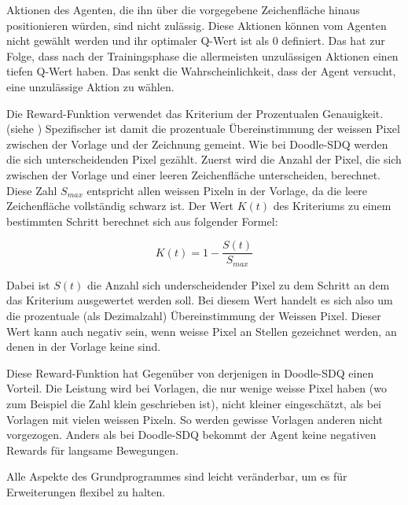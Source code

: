 Aktionen des Agenten, die ihn über die vorgegebene Zeichenfläche hinaus
positionieren würden, sind nicht zulässig. Diese Aktionen können vom Agenten
nicht gewählt werden und ihr optimaler Q-Wert ist als $0$ definiert. Das hat zur
Folge, dass nach der Trainingsphase die allermeisten unzulässigen Aktionen einen
tiefen Q-Wert haben. Das senkt die Wahrscheinlichkeit, dass der Agent versucht,
eine unzulässige Aktion zu wählen.

Die Reward-Funktion verwendet das Kriterium der Prozentualen Genauigkeit. (siehe )
Spezifischer ist damit die prozentuale Übereinstimmung der weissen Pixel
zwischen der Vorlage und der Zeichnung gemeint. Wie bei Doodle-SDQ werden die
sich unterscheidenden Pixel gezählt. Zuerst wird die Anzahl der Pixel, die sich
zwischen der Vorlage und einer leeren Zeichenfläche unterscheiden, berechnet.
Diese Zahl $S_{max}$ entspricht allen weissen Pixeln in der Vorlage, da die
leere Zeichenfläche vollständig schwarz ist. Der Wert $K(t)$ des Kriteriums zu
einem bestimmten Schritt berechnet sich aus folgender Formel:

\begin{equation}
    \label{eq:m_reward}
    K(t) = 1 - \frac{S(t)}{S_{max}}
\end{equation}

Dabei ist $S(t)$ die Anzahl sich underscheidender Pixel zu dem Schritt an dem
das Kriterium ausgewertet werden soll. Bei diesem Wert handelt es sich also um
die prozentuale (als Dezimalzahl) Übereinstimmung der Weissen Pixel. Dieser Wert
kann auch negativ sein, wenn weisse Pixel an Stellen gezeichnet werden, an denen
in der Vorlage keine sind.

Diese Reward-Funktion hat Gegenüber von derjenigen in
Doodle-SDQ einen Vorteil. Die Leistung wird bei Vorlagen, die nur wenige weisse
Pixel haben (wo zum Beispiel die Zahl klein geschrieben ist), nicht kleiner
eingeschätzt, als bei Vorlagen mit vielen weissen Pixeln. So werden gewisse
Vorlagen anderen nicht vorgezogen. Anders als bei Doodle-SDQ bekommt der Agent
keine negativen Rewards für langsame Bewegungen.

Alle Aspekte des Grundprogrammes sind leicht veränderbar, um es für
Erweiterungen flexibel zu halten.


